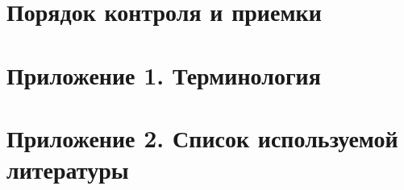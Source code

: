 \documentclass[
encoding=utf8
]{eskd}
\begin{document}
\newpage
\section{Порядок контроля и приемки}


\newpage
\section{Приложение 1. Терминология}


\newpage
\section{Приложение 2. Список используемой литературы}



\newpage
{}
{}    
\printindex
\end{document}
